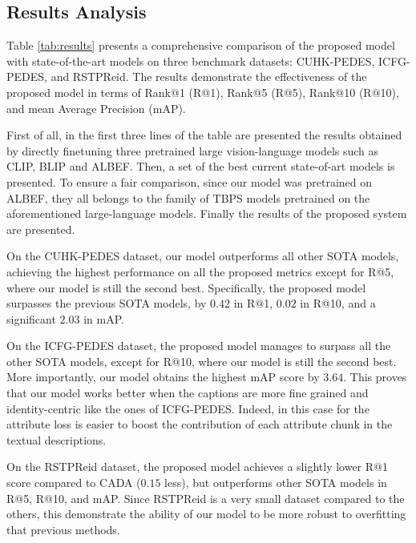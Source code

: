 \documentclass[acmsmall]{acmart}
\newcommand{\anote}[1]{\textcolor{red}{AP: #1}}
\newcommand{\mnote}[1]{\textcolor{purple}{MB: #1}}
\begin{document}
\subsection{Results Analysis}
Table \ref{tab:results} presents a comprehensive comparison of the proposed model with state-of-the-art models on three benchmark datasets: CUHK-PEDES, ICFG-PEDES, and RSTPReid. The results demonstrate the effectiveness of the proposed model in terms of Rank@1 (R@1), Rank@5 (R@5), Rank@10 (R@10), and mean Average Precision (mAP). %

First of all, in the first three lines of the table are presented the results obtained by directly finetuning three pretrained large vision-language models such as CLIP, BLIP and ALBEF. Then, a set of the best current state-of-art models is presented. To ensure a fair comparison, since our model was pretrained on ALBEF, they all belongs to the family of TBPS models pretrained on the aforementioned large-language models. Finally the results of the proposed system are presented.

On the CUHK-PEDES dataset, our model outperforms all other SOTA models, achieving the highest performance on all the proposed metrics except for R@5, where our model is still the second best. Specifically, the proposed model surpasses the previous SOTA models, by $0.42$ in R@1, $0.02$ in R@10, and a significant $2.03$ in mAP. 

On the ICFG-PEDES dataset,  the proposed model manages to surpass all the other SOTA models, except for R@10, where our model is still the second best. More importantly, our model obtains the highest mAP score by $3.64$. This proves that our model works better when the captions are more fine grained and identity-centric like the ones of ICFG-PEDES. Indeed, in this case for the attribute loss is easier to boost the contribution of each attribute chunk in the textual descriptions. %

On the RSTPReid dataset, the proposed model achieves a slightly lower R@1 score compared to CADA ($0.15$ less), but outperforms other SOTA models in R@5, R@10, and mAP. Since RSTPReid is a very small dataset compared to the others, this demonstrate the ability of our model to be more robust to overfitting that previous methods. %
\end{document}
